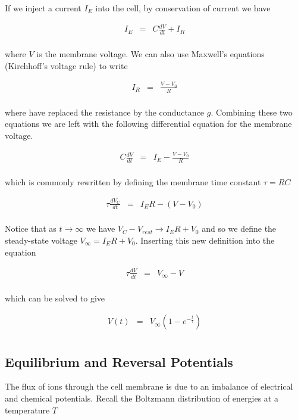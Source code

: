 \documentclass[a4paper,11pt]{book}
\begin{document}
If we inject a current $I_{E}$ into the cell, by conservation of current we have

\begin{eqnarray*}
I_{E} &=& C\frac{dV}{dt} + I_{R}\\
\end{eqnarray*}

where $V$ is the membrane voltage. We can also use Maxwell's equations (Kirchhoff's voltage rule) to write

\begin{eqnarray*}
I_{R} &=& \frac{V-V_{0}}{R}\\
\end{eqnarray*}


where have replaced the resistance by the conductance $g$. Combining these two equations we are left with the following differential equation for the membrane voltage.

\begin{eqnarray*}
C\frac{dV}{dt} &=& I_{E} - \frac{V - V_{0}}{R}\\
\end{eqnarray*}

which is commonly rewritten by defining the membrane time constant $\tau = RC$

\begin{eqnarray*}
\tau\frac{dV_{C}}{dt} &=& I_{E}R - (V - V_{0})\\
\end{eqnarray*}

Notice that as $t\rightarrow \infty$ we have $V_{C}-V_{rest} \rightarrow I_{E}R + V_{0}$ and so we define the steady-state voltage $V_{\infty} = I_{E}R + V_{0}$. Inserting this new definition into the equation

\begin{eqnarray*}
\tau\frac{dV}{dt} &=& V_{\infty} - V\\
\end{eqnarray*}

which can be solved to give

\begin{eqnarray*}
V(t) &=& V_{\infty}(1-e^{-\frac{t}{\tau}})\\
\end{eqnarray*}

\subsection{Equilibrium and Reversal Potentials}

The flux of ions through the cell membrane is due to an imbalance of electrical and chemical potentials. Recall the Boltzmann distribution of energies at a temperature $T$
\end{document}
